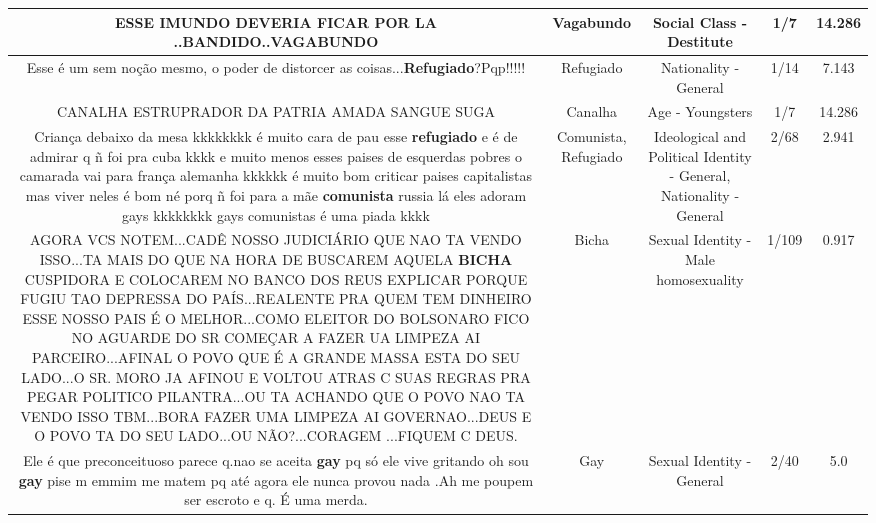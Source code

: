 \documentclass[11pt]{article}
\newlength\mylength
\begin{document}
\begin{center}
\begin{longtable}{|C{.65\mylength}|C{.30\mylength}|C{.12\mylength}|C{.12\mylength}|C{.12\mylength}|}
  \small ESSE IMUNDO DEVERIA FICAR POR LA ..BANDIDO..VAGABUNDO\normalsize   & Vagabundo & Social Class - Destitute & 1/7 & 14.286 \\  \hline
  \small Esse é um sem noção mesmo, o poder de distorcer as coisas...\textbf{Refugiado}?Pqp!!!!!\normalsize   & Refugiado & Nationality - General & 1/14 & 7.143 \\  \hline
  \small CANALHA ESTRUPRADOR DA PATRIA AMADA SANGUE SUGA\normalsize   & Canalha & Age - Youngsters & 1/7 & 14.286 \\  \hline
  \small Criança debaixo da mesa kkkkkkkk é muito cara de pau esse \textbf{refugiado} e é de admirar q ñ foi pra cuba kkkk e muito menos esses paises de esquerdas pobres o camarada vai para frança alemanha kkkkkk é muito bom criticar paises capitalistas mas viver neles é bom né porq ñ foi para a mãe \textbf{comunista} russia lá eles adoram gays kkkkkkkk gays comunistas é uma piada kkkk\normalsize   & Comunista, Refugiado & Ideological and Political Identity - General, Nationality - General & 2/68 & 2.941 \\  \hline
  \small AGORA VCS NOTEM...CADÊ NOSSO JUDICIÁRIO QUE NAO TA VENDO ISSO...TA MAIS DO QUE NA HORA DE BUSCAREM AQUELA \textbf{BICHA} CUSPIDORA E COLOCAREM NO BANCO DOS REUS EXPLICAR PORQUE FUGIU TAO DEPRESSA DO PAÍS...REALENTE PRA QUEM TEM DINHEIRO ESSE NOSSO PAIS É O MELHOR...COMO ELEITOR DO BOLSONARO FICO NO AGUARDE DO SR COMEÇAR A FAZER UA LIMPEZA AI PARCEIRO...AFINAL O POVO QUE É A GRANDE MASSA ESTA DO SEU LADO...O SR. MORO JA AFINOU E VOLTOU ATRAS C SUAS REGRAS PRA PEGAR POLITICO PILANTRA...OU TA ACHANDO QUE O POVO NAO TA VENDO ISSO TBM...BORA FAZER UMA LIMPEZA AI GOVERNAO...DEUS E O POVO TA DO SEU LADO...OU NÃO?...CORAGEM ...FIQUEM C DEUS.\normalsize   & Bicha & Sexual Identity - Male homosexuality & 1/109 & 0.917 \\  \hline
  \small Ele é que preconceituoso parece q.nao se aceita \textbf{gay} pq só ele vive gritando oh sou \textbf{gay} pise m emmim  me matem pq até agora ele nunca provou nada .Ah me poupem ser escroto e q. É uma merda.\normalsize   & Gay & Sexual Identity - General & 2/40 & 5.0 \\  \hline

\end{longtable}
\end{center}
\end{document}
